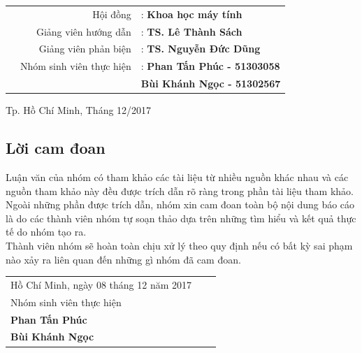 \documentclass[a4paper]{article}
\theoremstyle{definition}
\begin{document}
\begin{titlepage}
		\begin{table}[h]
			\begin{tabular}{rrl}
				\vspace{0.5cm}
				\hspace{1.5 cm} & Hội đồng & : \bf{Khoa học máy tính}\\
				\vspace{0.5cm}
				\hspace{1.5 cm} & Giảng viên hướng dẫn & : \bf{TS. Lê Thành Sách}\\
				\vspace{0.5cm}
				\hspace{1.5cm} & Giảng viên phản biện & : \bf{TS. Nguyễn Đức Dũng}\\
				\vspace{0.5cm}
				\hspace{1.5 cm} & Nhóm sinh viên thực hiện & : \bf{Phan Tấn Phúc - 51303058}\\
				\hspace{1.5 cm} & \hspace{5 cm} &  \hspace{0.15cm} \bf{Bùi Khánh Ngọc - 51302567}\\
				
			\end{tabular}
		\end{table}
		\vspace{2cm}
		\begin{center}
			{\footnotesize Tp. Hồ Chí Minh, Tháng 12/2017}
		\end{center}
	\end{titlepage}
	\newpage
	\subsection*{Lời cam đoan}
	Luận văn của nhóm có tham khảo các tài liệu từ nhiều nguồn khác nhau và các nguồn tham khảo này đều được trích dẫn rõ ràng trong phần tài liệu tham khảo. Ngoài những phần được trích dẫn, nhóm xin cam đoan toàn bộ nội dung báo cáo là do các thành viên nhóm tự soạn thảo dựa trên những tìm hiểu và kết quả thực tế do nhóm tạo ra. \\
	Thành viên nhóm sẽ hoàn toàn chịu xử lý theo quy định nếu có bất kỳ sai phạm nào xảy ra liên quan đến những gì nhóm đã cam đoan.
	\begin{table}[h]
		\begin{tabular}{lll}
			\hspace{8cm} Hồ Chí Minh, ngày 08 tháng 12 năm 2017\\
			\hspace{10cm}Nhóm sinh viên thực hiện\\
			\hspace{10.5cm}\textbf{Phan Tấn Phúc}\\
			\hspace{10.5cm}\textbf{Bùi Khánh Ngọc}
		\end{tabular}
	\end{table}
	
\end{document}
